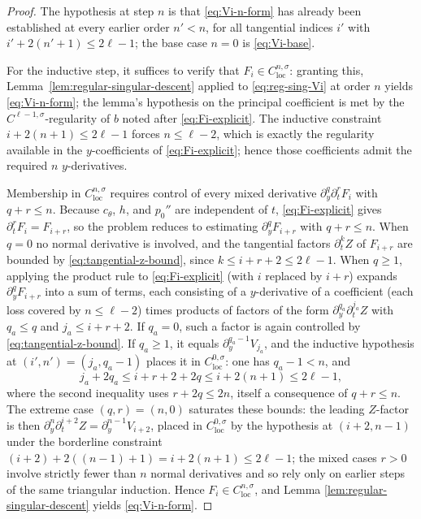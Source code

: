 \documentclass[11pt]{amsart}
\newcommand{\loc}{\mathrm{loc}}
\begin{document}
\begin{proof}
The hypothesis at step \(n\) is that \eqref{eq:Vi-n-form} has already
been established at every earlier order \(n'<n\), for all tangential
indices \(i'\) with \(i'+2(n'+1)\le2\ell-1\); the base case \(n=0\) is
\eqref{eq:Vi-base}.

For the inductive step, it suffices to verify that
\(F_i\in C^{n,\sigma}_{\loc}\): granting this,
Lemma~\ref{lem:regular-singular-descent} applied to
\eqref{eq:reg-sing-Vi} at order \(n\) yields \eqref{eq:Vi-n-form}; the
lemma's hypothesis on the principal coefficient is met by the
\(C^{\ell-1,\sigma}\)-regularity of \(b\) noted after
\eqref{eq:Fi-explicit}. The inductive constraint
\(i+2(n+1)\le2\ell-1\) forces \(n\le\ell-2\), which is exactly the
regularity available in the \(y\)-coefficients of
\eqref{eq:Fi-explicit}; hence those coefficients admit the required
\(n\) \(y\)-derivatives.

Membership in \(C^{n,\sigma}_{\loc}\) requires control of every mixed
derivative \(\partial_y^q\partial_t^rF_i\) with \(q+r\le n\). Because
\(c_\theta\), \(h\), and \(p_0''\) are independent of \(t\),
\eqref{eq:Fi-explicit} gives \(\partial_t^rF_i=F_{i+r}\), so the
problem reduces to estimating \(\partial_y^qF_{i+r}\) with
\(q+r\le n\). When \(q=0\) no normal derivative is involved, and the
tangential factors \(\partial_t^kZ\) of \(F_{i+r}\) are bounded by
\eqref{eq:tangential-z-bound}, since \(k\le i+r+2\le2\ell-1\). When
\(q\ge1\), applying the product rule to \eqref{eq:Fi-explicit} (with
\(i\) replaced by \(i+r\)) expands \(\partial_y^qF_{i+r}\) into a sum
of terms, each consisting of a \(y\)-derivative of a coefficient (each
loss covered by \(n\le\ell-2\)) times products of factors of the form
\(\partial_y^{q_a}\partial_t^{j_a}Z\) with \(q_a\le q\) and
\(j_a\le i+r+2\). If \(q_a=0\), such a factor is again controlled by
\eqref{eq:tangential-z-bound}. If \(q_a\ge1\), it equals
\(\partial_y^{q_a-1}V_{j_a}\), and the inductive hypothesis at
\((i',n')=(j_a,q_a-1)\) places it in \(C^{0,\sigma}_{\loc}\): one has
\(q_a-1<n\), and
\[
        j_a+2q_a\le i+r+2+2q\le i+2(n+1)\le2\ell-1,
\]
where the second inequality uses \(r+2q\le2n\), itself a consequence
of \(q+r\le n\). The extreme case \((q,r)=(n,0)\) saturates these
bounds: the leading \(Z\)-factor is then
\(\partial_y^n\partial_t^{i+2}Z=\partial_y^{n-1}V_{i+2}\), placed in
\(C^{0,\sigma}_{\loc}\) by the hypothesis at \((i+2,n-1)\) under the
borderline constraint \((i+2)+2((n-1)+1)=i+2(n+1)\le2\ell-1\); the
mixed cases \(r>0\) involve strictly fewer than \(n\) normal
derivatives and so rely only on earlier steps of the same triangular
induction. Hence \(F_i\in C^{n,\sigma}_{\loc}\), and Lemma
\ref{lem:regular-singular-descent} yields \eqref{eq:Vi-n-form}.


\end{proof}
\end{document}
